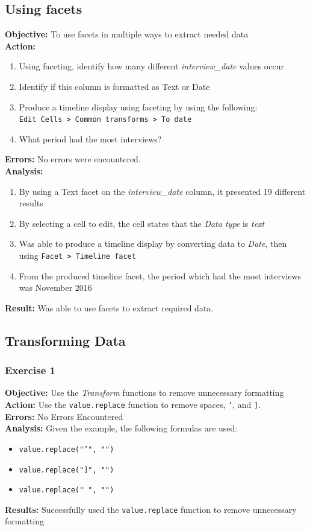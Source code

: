 \documentclass{article}
\begin{document}
\subsection{Using facets}
\textbf{Objective:} To use facets in multiple ways to extract needed data\\
\textbf{Action:}
\begin{enumerate}
    \item Using faceting, identify how many different \textit{interview\_date} values occur
    \item Identify if this column is formatted as Text or Date
    \item Produce a timeline display using faceting by using the following:\\
    \texttt{Edit Cells > Common transforms > To date}
    \item What period had the most interviews?
\end{enumerate}
\textbf{Errors:} No errors were encountered.\\
\textbf{Analysis:}
\begin{enumerate}
    \item By using a Text facet on the \textit{interview\_date} column, it presented 19 different results
    \item By selecting a cell to edit, the cell states that the \textit{Data type} is \textit{text}
    \item Was able to produce a timeline display by converting data to \textit{Date}, then using \texttt{Facet > Timeline facet}
    \item From the produced timeline facet, the period which had the most interviews was November 2016
\end{enumerate}
\textbf{Result:} Was able to use facets to extract required data.
\subsection{Transforming Data}
\subsubsection{Exercise 1}
\textbf{Objective:} Use the \textit{Transform} functions to remove unnecessary formatting\\
\textbf{Action:} Use the \texttt{value.replace} function to remove spaces, \texttt{'}, and \texttt{]}.\\
\textbf{Errors:} No Errors Encountered\\
\textbf{Analysis:} Given the example, the following formulas are used:
\begin{itemize}
    \item \texttt{value.replace("'", "")}
    \item \texttt{value.replace("]", "")}
    \item \texttt{value.replace(" ", "")}
\end{itemize}
\textbf{Results:} Successfully used the \texttt{value.replace} function to remove unnecessary formatting\\
\end{document}
